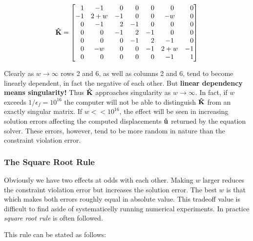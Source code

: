 \begin{equation}
    \mathbf{\hat{K}} =
    \begin{bmatrix}
        \phantom{-}1 & -1 & \phantom{-}0 & \phantom{-}0 & \phantom{-}0 & \phantom{-}0 & \phantom{-}0 \\
        -1 & 2+w & -1 & \phantom{-}0 & \phantom{-}0 & -w & \phantom{-}0 \\
        \phantom{-}0 & -1 & \phantom{-}2 & -1 & \phantom{-}0 & \phantom{-}0 & \phantom{-}0 \\
        \phantom{-}0 & \phantom{-}0 & -1 & \phantom{-}2 & -1 & \phantom{-}0 & \phantom{-}0 \\
        \phantom{-}0 & \phantom{-}0 & \phantom{-}0 & -1 & \phantom{-}2 & -1 & \phantom{-}0 \\
        \phantom{-}0 & -w & \phantom{-}0 & \phantom{-}0 & -1 & 2+w & -1 \\
        \phantom{-}0 & \phantom{-}0 & \phantom{-}0 & \phantom{-}0 & \phantom{-}0 & -1 & \phantom{-}1
    \end{bmatrix}
\end{equation}

Clearly as $ w \rightarrow \infty $ rows 2 and 6, as well as columns 2 and 6, tend
to become linearly dependent, in fact the negative of each other. But
\textbf{linear dependency means singularity!} Thus $ \mathbf{\hat{K}} $
approaches singularity as $ w \rightarrow \infty $. In fact, if $ w $ exceeds
$ 1 / \epsilon_f = 10^16 $ the computer will not be able to distinguish
$ \mathbf{\hat{K}} $ from an exactly singular matrix. If $ w << 10^16 $, the
effect will be seen in increasing solution errors affecting the computed
displacements $ \mathbf{\hat{u}} $ returned by the equation solver.
These errors, however, tend to be more random in nature than the constraint
violation error.

\subsubsection{The Square Root Rule}

Obviously we have two effects at odds with each other. Making $ w $ larger
reduces the constraint violation error but increases the solution error. The
best $ w $ is that which makes both errors roughly equal in absolute value.
This tradeoff value is difficult to find aside of systematicelly running
numerical experiments. In practice \textit{square root rule} is often followed.

This rule can be stated as follows:

